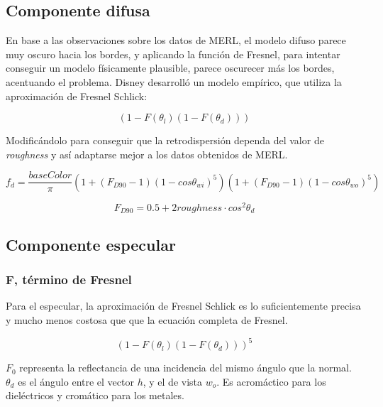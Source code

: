         \subsection{Componente difusa}
    
        En base a las observaciones sobre los datos de MERL, el modelo difuso parece muy oscuro hacia los bordes, y aplicando
        la funci\'on de Fresnel, para intentar conseguir un modelo f\'isicamente plausible, parece oscurecer m\'as los bordes,
        acentuando el problema. Disney desarroll\'o un modelo emp\'irico, que utiliza la aproximaci\'on de Fresnel Schlick:
    
        \begin{equation}
            (1 - F(\theta_l) (1 - F(\theta_d)))
        \end{equation}
        \singlespacing
    
    
        Modific\'andolo para conseguir que la retrodispersi\'on dependa del valor de \textit{roughness} y as\'i
        adaptarse mejor a los datos obtenidos de MERL.
    
        \begin{equation}
        f_d = \frac{baseColor}{\pi}
        \left(  1 + (F_{D90} - 1)(1 - cos\theta_{wi})^5  \right)
        \left(  1 + (F_{D90} - 1)(1 - cos\theta_{wo})^5  \right)
        \end{equation}
        
        $$
        F_{D90} = 0.5 + 2roughness\cdot{cos^2\theta_d}
        $$
    
        \subsection{Componente especular}
            \subsubsection{F, t\'ermino de Fresnel}
                Para el especular, la aproximaci\'on de Fresnel Schlick es lo suficientemente precisa y mucho menos costosa que
                que la ecuaci\'on completa de Fresnel.
    
                \begin{equation}
                (1 - F(\theta_l) (1 - F(\theta_d)))^5
                \end{equation}
    
                $F_0$ representa la reflectancia de una incidencia del mismo \'angulo que la normal. $\theta_d$ es el \'angulo
                entre el vector $h$, y el de vista $w_o$. Es acrom\'actico para los diel\'ectricos y crom\'atico para los metales.
    
